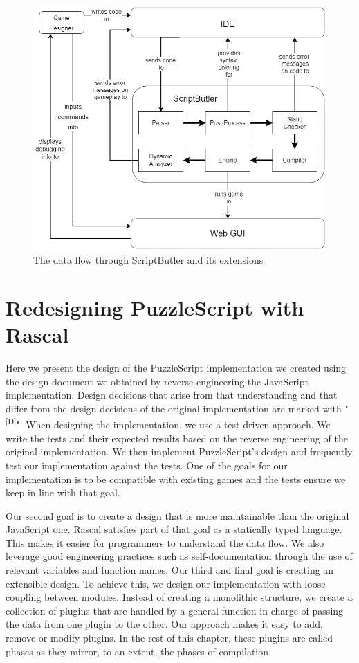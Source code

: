 \begin{figure}[!t]
    \centering
    \includegraphics[width=1\textwidth]{images/ScriptButler Flow.png}
    \caption{The data flow through ScriptButler and its extensions}
    \label{fig:scriptbutler_flow}
\end{figure}

\section{Redesigning PuzzleScript with Rascal}
\newcommand{\dd}{\textsuperscript{[D]}}
Here we present the design of the PuzzleScript implementation we created using the design document we obtained by reverse-engineering the JavaScript implementation. Design decisions that arise from that understanding and that differ from the design decisions of the original implementation are marked with "\dd". When designing the implementation, we use a test-driven approach. We write the tests and their expected results based on the reverse engineering of the original implementation. We then implement PuzzleScript's design and frequently test our implementation against the tests. One of the goals for our implementation is to be compatible with existing games and the tests ensure we keep in line with that goal.

Our second goal is to create a design that is more maintainable than the original JavaScript one. Rascal satisfies part of that goal as a statically typed language. This makes it easier for programmers to understand the data flow. We also leverage good engineering practices such as self-documentation through the use of relevant variables and function names. Our third and final goal is creating an extensible design. To achieve this, we design our implementation with loose coupling between modules. Instead of creating a monolithic structure, we create a collection of plugins that are handled by a general function in charge of passing the data from one plugin to the other. Our approach makes it easy to add, remove or modify plugins. In the rest of this chapter, these plugins are called phases as they mirror, to an extent, the phases of compilation.

